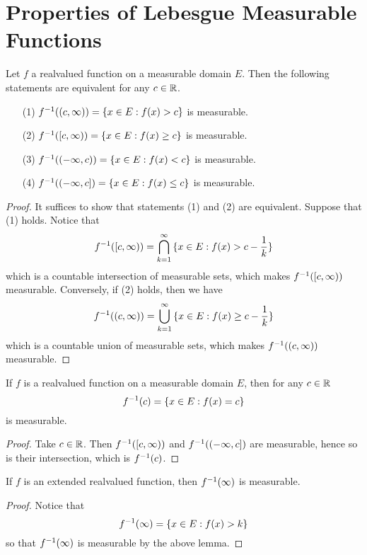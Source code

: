 \section{Properties of Lebesgue Measurable Functions}

\begin{lemma}\label{9.1.1}
    Let $f$ a realvalued function on a measurable domain $E$. Then the following
    statements are equivalent for any $c \in \mathbb{R}$.
    \begin{enumerate}
        \item[(1)] $f^{-1}((c,\infty))=\{x \in E : f(x)>c\}$ is measurable.

        \item[(2)] $f^{-1}([c,\infty))=\{x \in E : f(x)\geq c\}$ is measurable.

        \item[(3)] $f^{-1}((-\infty,c))=\{x \in E : f(x)<c\}$ is measurable.

        \item[(4)] $f^{-1}((-\infty,c])=\{x \in E : f(x) \leq c\}$ is measurable.
    \end{enumerate}
\end{lemma}
\begin{proof}
    It suffices to show that statements (1) and (2) are equivalent. Suppose that
    (1) holds. Notice that
    \begin{equation*}
        f^{-1}([c,\infty))=\bigcap_{k=1}^\infty{\{x \in E : f(x)>c-\frac{1}{k}\}}
    \end{equation*}
    which is a countable intersection of measurable sets, which makes
    $f^{-1}([c,\infty))$ measurable. Conversely, if (2) holds, then we have
    \begin{equation*}
        f^{-1}((c,\infty))=\bigcup_{k=1}^\infty{\{x \in E : f(x) \geq
        c-\frac{1}{k}\}}
    \end{equation*}
    which is a countable union of measurable sets, which makes
    $f^{-1}((c,\infty))$ measurable.
\end{proof}
\begin{corollary}
    If $f$ is a realvalued function on a measurable domain $E$, then for any $c
    \in \mathbb{R}$
    \begin{equation*}
        f^{-1}(c)=\{x \in E : f(x)=c\}
    \end{equation*}
    is measurable.
\end{corollary}
\begin{proof}
    Take $c \in \mathbb{R}$. Then  $f^{-1}([c,\infty))$ and $f^{-1}((-\infty,c])$ are
    measurable, hence so is their intersection, which is $f^{-1}(c)$.
\end{proof}
\begin{corollary}
    If $f$ is an extended realvalued function, then  $f^{-1}(\infty)$ is
    measurable.
\end{corollary}
\begin{proof}
    Notice that
    \begin{equation*}
        f^{-1}(\infty)=\{x \in E : f(x)>k\}
    \end{equation*}
    so that $f^{-1}(\infty)$ is measurable by the above lemma.
\end{proof}

